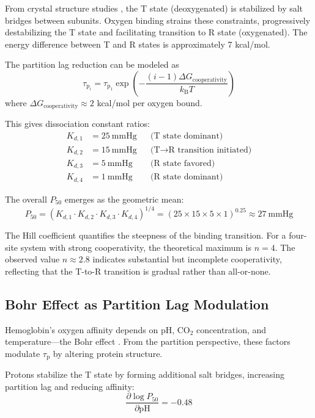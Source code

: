 \documentclass[10pt,twocolumn,a4paper]{article}
\theoremstyle{remark}
\newcommand{\kB}{k_{\mathrm{B}}}
\newcommand{\taulag}{\tau_{\mathrm{p}}}
\begin{document}
From crystal structure studies \cite{perutz1970stereochemistry}, the T state (deoxygenated) is stabilized by salt bridges between subunits. Oxygen binding strains these constraints, progressively destabilizing the T state and facilitating transition to R state (oxygenated). The energy difference between T and R states is approximately 7 kcal/mol.

The partition lag reduction can be modeled as
\begin{equation}
\taulag_{i} = \taulag_{1} \exp\left(-\frac{(i-1) \Delta G_{\mathrm{cooperativity}}}{\kB T}\right)
\end{equation}
where $\Delta G_{\mathrm{cooperativity}} \approx 2$ kcal/mol per oxygen bound.

This gives dissociation constant ratios:
\begin{align}
K_{d,1} &= 25~\mathrm{mmHg} &&\text{(T state dominant)} \\
K_{d,2} &= 15~\mathrm{mmHg} &&\text{(T} \to \text{R transition initiated)} \\
K_{d,3} &= 5~\mathrm{mmHg} &&\text{(R state favored)} \\
K_{d,4} &= 1~\mathrm{mmHg} &&\text{(R state dominant)}
\end{align}

The overall $P_{50}$ emerges as the geometric mean:
\begin{equation}
P_{50} = (K_{d,1} \cdot K_{d,2} \cdot K_{d,3} \cdot K_{d,4})^{1/4} = (25 \times 15 \times 5 \times 1)^{0.25} \approx 27~\mathrm{mmHg}
\end{equation}

The Hill coefficient quantifies the steepness of the binding transition. For a four-site system with strong cooperativity, the theoretical maximum is $n = 4$. The observed value $n \approx 2.8$ indicates substantial but incomplete cooperativity, reflecting that the T-to-R transition is gradual rather than all-or-none.

\subsection{Bohr Effect as Partition Lag Modulation}

Hemoglobin's oxygen affinity depends on pH, CO$_{2}$ concentration, and temperature—the Bohr effect \cite{bohr1904haemoglobin}. From the partition perspective, these factors modulate $\taulag$ by altering protein structure.

Protons stabilize the T state by forming additional salt bridges, increasing partition lag and reducing affinity:
\begin{equation}
\frac{\partial \log P_{50}}{\partial \mathrm{pH}} = -0.48
\end{equation}
\end{document}
